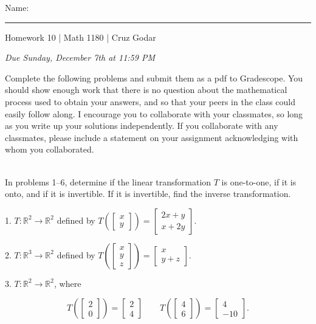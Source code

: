 \documentclass{article}
\begin{document}
\Large Name: \rule{2in}{0.15mm} \hfill Homework 10 | Math 1180 | Cruz Godar \vspace{4pt}  \normalsize

\textit{Due Sunday, December 7th at 11:59 PM}

Complete the following problems and submit them as a pdf to Gradescope. You should show enough work that there is no question about the mathematical process used to obtain your answers, and so that your peers in the class could easily follow along. I encourage you to collaborate with your classmates, so long as you write up your solutions independently. If you collaborate with any classmates, please include a statement on your assignment acknowledging with whom you collaborated.

~\\

In problems 1--6, determine if the linear transformation $T$ is one-to-one, if it is onto, and if it is invertible. If it is invertible, find the inverse transformation.

1. $T: \mathbb{R}^2 \to \mathbb{R}^2$ defined by $T\left(\left[\begin{array}{c} x \\ y \end{array}\right]\right) = \left[\begin{array}{c} 2x + y \\ x + 2y\end{array}\right]$.

2. $T: \mathbb{R}^3 \to \mathbb{R}^2$ defined by $T\left(\left[\begin{array}{c} x \\ y \\ z \end{array}\right]\right) = \left[\begin{array}{c} x \\ y + z \end{array}\right]$.

3. $T: \mathbb{R}^2 \to \mathbb{R}^2$, where

$$
	T\left(\left[\begin{array}{c} 2 \\ 0 \end{array}\right]\right) = \left[\begin{array}{c} 2 \\ 4 \end{array}\right] \qquad T\left(\left[\begin{array}{c} 4 \\ 6 \end{array}\right]\right) = \left[\begin{array}{c} 4 \\ -10 \end{array}\right].
$$
\end{document}
